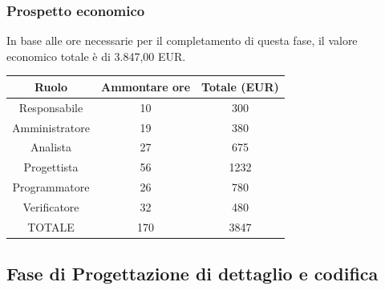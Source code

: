 \subsubsection{Prospetto economico}
In base alle ore necessarie per il completamento di questa fase, il valore economico totale è di 3.847,00 EUR.
\begin{center}
\begin{tabular}{ |c|c|c|  }
 \hline
 Ruolo 		& Ammontare ore 	& Totale (EUR)\\
 	\hline
 \hline
 	Responsabile	& 10 		& 300\\
	Amministratore	& 19		& 380\\
	Analista		& 27 	& 675\\
	Progettista		& 56		& 1232\\
	Programmatore	& 26		& 780\\
	Verificatore	& 32 	& 480\\
 \hline\hline
 TOTALE		& 170		& 3847\\
  \hline
\end{tabular}
\end{center}

\newpage
\subsection{Fase di Progettazione di dettaglio e codifica}
